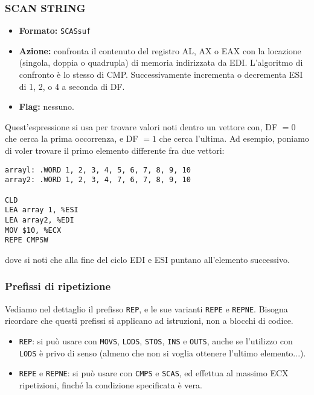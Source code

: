 \documentclass[a4paper,11pt]{article}
\begin{document}
\subsubsection{SCAN STRING}
\begin{itemize}
	\item \textbf{Formato:} \lstinline|SCASsuf| 
	\item \textbf{Azione:} confronta il contenuto del registro AL, AX o EAX con la locazione (singola, doppia o quadrupla) di memoria indirizzata da EDI. L'algoritmo di confronto è lo stesso di CMP. 
		Successivamente incrementa o decrementa ESI di 1, 2, o 4 a seconda di DF. 

	\item \textbf{Flag:} nessuno.
\end{itemize}

Quest'espressione si usa per trovare valori noti dentro un vettore con, DF $=0$ che cerca la prima occorrenza, e DF $=1$ che cerca l'ultima. Ad esempio, poniamo di voler trovare il primo elemento differente fra due vettori:
\begin{lstlisting}	
arrayl: .WORD 1, 2, 3, 4, 5, 6, 7, 8, 9, 10
array2: .WORD 1, 2, 3, 4, 7, 6, 7, 8, 9, 10

CLD
LEA array 1, %ESI
LEA array2, %EDI
MOV $10, %ECX
REPE CMPSW
\end{lstlisting}

dove si noti che alla fine del ciclo EDI e ESI puntano all'elemento successivo. 

\subsubsection{Prefissi di ripetizione}
Vediamo nel dettaglio il prefisso \lstinline|REP|, e le sue varianti \lstinline|REPE| e \lstinline|REPNE|.
Bisogna ricordare che questi prefissi si applicano ad istruzioni, non a blocchi di codice.
\begin{itemize}
	\item \lstinline|REP|: si può usare con \lstinline|MOVS|, \lstinline|LODS|, \lstinline|STOS|, \lstinline|INS| e \lstinline|OUTS|, anche se l'utilizzo con \lstinline|LODS| è privo di senso (almeno che non si voglia ottenere l'ultimo elemento...).
	\item \lstinline|REPE| e \lstinline|REPNE|: si può usare con \lstinline|CMPS| e \lstinline|SCAS|, ed effettua al massimo ECX ripetizioni, finché la condizione specificata è vera.
\end{itemize}
\end{document}
